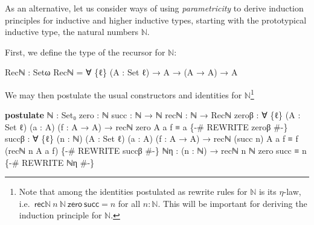 \documentclass[
  12pt]{article}
\newenvironment{Shaded}{\begin{snugshade}}{\end{snugshade}}
\newcommand{\DataTypeTok}[1]{\textcolor[rgb]{0.00,0.34,0.68}{#1}}
\newcommand{\KeywordTok}[1]{\textcolor[rgb]{0.12,0.11,0.11}{\textbf{#1}}}
\newcommand{\NormalTok}[1]{\textcolor[rgb]{0.12,0.11,0.11}{#1}}
\newcommand{\OtherTok}[1]{\textcolor[rgb]{0.00,0.43,0.16}{#1}}
\newcommand{\PreprocessorTok}[1]{\textcolor[rgb]{0.00,0.43,0.16}{#1}}
\begin{document}
As an alternative, let us consider ways of using \emph{parametricity} to
derive induction principles for inductive and higher inductive types,
starting with the prototypical inductive type, the natural numbers
\(\mathbb{N}\).

First, we define the type of the recursor for \(\mathbb{N}\):

\begin{Shaded}
\begin{Highlighting}[]
\NormalTok{Recℕ }\OtherTok{:}\NormalTok{ Setω}
\NormalTok{Recℕ }\OtherTok{=} \OtherTok{∀} \OtherTok{\{}\NormalTok{ℓ}\OtherTok{\}} \OtherTok{(}\NormalTok{A }\OtherTok{:} \DataTypeTok{Set}\NormalTok{ ℓ}\OtherTok{)} \OtherTok{→}\NormalTok{ A }\OtherTok{→} \OtherTok{(}\NormalTok{A }\OtherTok{→}\NormalTok{ A}\OtherTok{)} \OtherTok{→}\NormalTok{ A}
\end{Highlighting}
\end{Shaded}

We may then postulate the usual constructors and identities for
\(\mathbb{N}\)\footnote{Note that among the identities postulated as
  rewrite rules for \(\mathbb{N}\) is its \(\eta\)-law,
  i.e.~\(\mathsf{rec\mathbb{N}} ~ n ~ \mathbb{N} ~ \mathsf{zero} ~ \mathsf{succ} = n\)
  for all \(n : \mathbb{N}\). This will be important for deriving the
  induction principle for \(\mathbb{N}\).}

\begin{Shaded}
\begin{Highlighting}[]
\KeywordTok{postulate}
\NormalTok{    ℕ }\OtherTok{:} \DataTypeTok{Set₀}
\NormalTok{    zero }\OtherTok{:}\NormalTok{ ℕ}
\NormalTok{    succ }\OtherTok{:}\NormalTok{ ℕ }\OtherTok{→}\NormalTok{ ℕ}
\NormalTok{    recℕ }\OtherTok{:}\NormalTok{ ℕ }\OtherTok{→}\NormalTok{ Recℕ}
\NormalTok{    zeroβ }\OtherTok{:} \OtherTok{∀} \OtherTok{\{}\NormalTok{ℓ}\OtherTok{\}} \OtherTok{(}\NormalTok{A }\OtherTok{:} \DataTypeTok{Set}\NormalTok{ ℓ}\OtherTok{)} \OtherTok{(}\NormalTok{a }\OtherTok{:}\NormalTok{ A}\OtherTok{)} \OtherTok{(}\NormalTok{f }\OtherTok{:}\NormalTok{ A }\OtherTok{→}\NormalTok{ A}\OtherTok{)} \OtherTok{→}\NormalTok{ recℕ zero A a f ≡ a}
    \PreprocessorTok{\{{-}\# REWRITE zeroβ \#{-}\}}
\NormalTok{    succβ }\OtherTok{:} \OtherTok{∀} \OtherTok{\{}\NormalTok{ℓ}\OtherTok{\}} \OtherTok{(}\NormalTok{n }\OtherTok{:}\NormalTok{ ℕ}\OtherTok{)} \OtherTok{(}\NormalTok{A }\OtherTok{:} \DataTypeTok{Set}\NormalTok{ ℓ}\OtherTok{)} \OtherTok{(}\NormalTok{a }\OtherTok{:}\NormalTok{ A}\OtherTok{)} \OtherTok{(}\NormalTok{f }\OtherTok{:}\NormalTok{ A }\OtherTok{→}\NormalTok{ A}\OtherTok{)}
            \OtherTok{→}\NormalTok{ recℕ }\OtherTok{(}\NormalTok{succ n}\OtherTok{)}\NormalTok{ A a f ≡ f }\OtherTok{(}\NormalTok{recℕ n A a f}\OtherTok{)}
    \PreprocessorTok{\{{-}\# REWRITE succβ \#{-}\}}
\NormalTok{    ℕη }\OtherTok{:} \OtherTok{(}\NormalTok{n }\OtherTok{:}\NormalTok{ ℕ}\OtherTok{)} \OtherTok{→}\NormalTok{ recℕ n ℕ zero succ ≡ n}
    \PreprocessorTok{\{{-}\# REWRITE ℕη \#{-}\}}
\end{Highlighting}
\end{Shaded}
\end{document}
